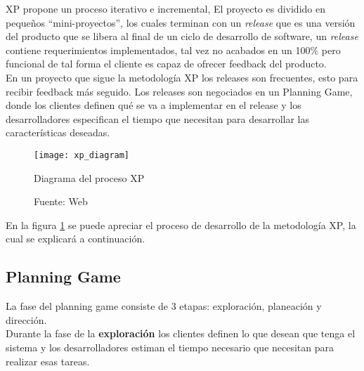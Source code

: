 
        XP propone un proceso iterativo e incremental, El proyecto es dividido en pequeños “mini-proyectos”, los cuales terminan con un \emph{release} que es una versión del producto que se libera al final de un ciclo de desarrollo de software, un \emph{release} contiene requerimientos implementados, tal vez no acabados en un  100\% pero funcional de tal forma el cliente es capaz de ofrecer feedback del producto.\\

      En un proyecto que sigue la metodología XP los releases son frecuentes, esto para recibir feedback más seguido. Los releases son negociados en un Planning Game, donde los clientes definen qué se va a implementar en el release y los desarrolladores especifican el tiempo que necesitan para desarrollar las características deseadas.\\

      \begin{figure}[H]
        \begin{center}
          \texttt{[image: xp\_diagram]}
          \caption{Diagrama del proceso XP}
          \label{fig:xp_diagram}
          \caption*{Fuente: Web}
        \end{center}
      \end{figure}

      En la figura \ref{fig:xp_diagram} se puede apreciar el proceso de desarrollo de la metodología XP, la cual se explicará a continuación.\\

        \subsection{Planning Game}
        \label{sub:planning_game}

        La fase del planning game consiste de 3 etapas: exploración, planeaci\'on y direcci\'on.\\

        Durante la fase de la \textbf{exploración} los clientes definen lo que desean que tenga el sistema y los desarrolladores estiman el tiempo necesario que necesitan para realizar esas tareas.\\

